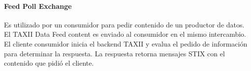 \paragraph{Feed Poll Exchange}

Es utilizado por un consumidor para pedir contenido de un productor de datos. El TAXII Data Feed content es enviado al consumidor en el mismo intercambio.
El cliente consumidor inicia el backend TAXII y evalua el pedido de información para determinar la respuesta. La respuesta retorna mensajes STIX con el contenido que pidió el cliente.
